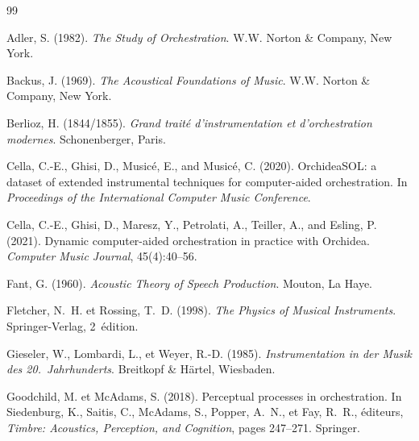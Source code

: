 \documentclass[12pt,a4paper]{article}
\begin{document}



\begin{thebibliography}{99}

Adler, S. (1982).
\newblock \emph{The Study of Orchestration}.
\newblock W.W. Norton \& Company, New York.

Backus, J. (1969).
\newblock \emph{The Acoustical Foundations of Music}.
\newblock W.W. Norton \& Company, New York.

Berlioz, H. (1844/1855).
\newblock \emph{Grand trait\'e d'instrumentation et d'orchestration modernes}.
\newblock Schonenberger, Paris.

Cella, C.-E., Ghisi, D., Music{\'e}, E., and Music{\'e}, C. (2020).
\newblock OrchideaSOL: a dataset of extended instrumental techniques for
  computer-aided orchestration.
\newblock In \emph{Proceedings of the International Computer Music Conference}.

Cella, C.-E., Ghisi, D., Maresz, Y., Petrolati, A., Teiller, A., and
  Esling, P. (2021).
\newblock Dynamic computer-aided orchestration in practice with {O}rchidea.
\newblock \emph{Computer Music Journal}, 45(4):40--56.

Fant, G. (1960).
\newblock \emph{Acoustic Theory of Speech Production}.
\newblock Mouton, La Haye.

Fletcher, N.~H. et Rossing, T.~D. (1998).
\newblock \emph{The Physics of Musical Instruments}.
\newblock Springer-Verlag, 2\ieme~édition.

Gieseler, W., Lombardi, L., et Weyer, R.-D. (1985).
\newblock \emph{Instrumentation in der Musik des 20.\ Jahrhunderts}.
\newblock Breitkopf \& H{\"a}rtel, Wiesbaden.

Goodchild, M. et McAdams, S. (2018).
\newblock Perceptual processes in orchestration.
\newblock In Siedenburg, K., Saitis, C., McAdams, S., Popper, A.~N., et
  Fay, R.~R., éditeurs, \emph{Timbre: Acoustics, Perception, and Cognition},
  pages 247--271. Springer.


\end{thebibliography}
\end{document}
